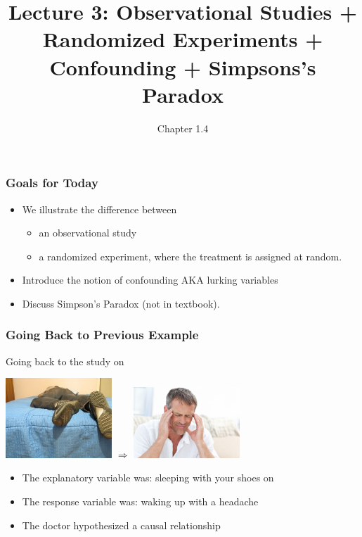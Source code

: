 \documentclass[handout]{beamer}
\title{Lecture 3: Observational Studies + Randomized Experiments + Confounding + Simpsons's Paradox}
\author{Chapter 1.4}
\date{}
\newcommand{\blue}[1]{\textcolor{blue2}{#1}}
\begin{document}
\begin{frame}
\titlepage
\end{frame}


\begin{frame}
\frametitle{Goals for Today}

\begin{itemize}
\item We illustrate the difference between
\begin{itemize}
  \item an \blue{observational study}
  \item a \blue{randomized experiment}, where the treatment is assigned at random.
\end{itemize}
\item Introduce the notion of confounding AKA lurking variables
\item Discuss \blue{Simpson's Paradox} (not in textbook).
\end{itemize}

\end{frame}


\begin{frame}
\frametitle{Going Back to Previous Example}

Going back to the study on 
\begin{center}
\includegraphics[width=0.3\textwidth]{figure/shoes.jpg}
\hspace{1cm}
$\Longrightarrow$
\hspace{1cm}
\includegraphics[width=0.3\textwidth]{figure/headache.jpg}
\end{center}

\begin{itemize}
\item The explanatory variable was: sleeping with your shoes on
\item The response variable was: waking up with a headache
\item The doctor hypothesized a \blue{causal} relationship
\end{itemize}

\end{frame}
\end{document}
